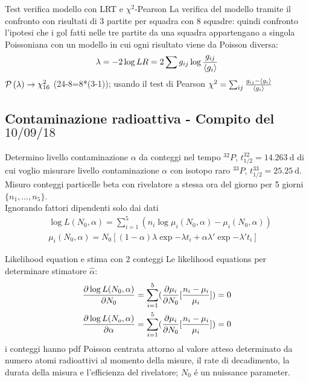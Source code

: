 \begin{frame}{Test verifica modello con LRT e $\chi^2$-Pearson}
La verifica del modello tramite il confronto con risultati di 3 partite per squadra con 8 squadre: quindi confronto l'ipotesi che i gol fatti nelle tre partite da una squadra appartengano a singola Poissoniana con un modello in cui ogni risultato viene da Poisson diversa:
\[\lambda=-2\log{LR}=2\sum g_{ij}\log{\frac{g_{ij}}{\exv{g_i}}}\]
$\prob{(\lambda)}\to\chi^2_{16}$ (24-8=8*(3-1)); usando il test di Pearson $\chi^2=\sum_{ij}\frac{g_{ij}-\exv{g_i}}{\exv{g_i}}$
\end{frame}

\subsection{Contaminazione radioattiva - Compito del $10/09/18$}

\begin{frame}{Determino livello contaminazione $\alpha$ da conteggi nel tempo}
$^{32}P$, $t_{1/2}^{32}=\SI{14.263}{\day}$ di cui voglio misurare livello contaminazione $\alpha$ con isotopo raro $^{33}P$, $t_{1/2}^{33}=\SI{25.25}{\day}$. Misuro conteggi particelle beta con rivelatore a stessa ora del giorno per 5 giorni $\{n_1,\ldots,n_5\}$.\\
Ignorando fattori dipendenti solo dai dati
\begin{align*}
&\log{L(N_0,\alpha)}=\sum_{i=1}^5(n_i\log{\mu_i(N_0,\alpha)}-\mu_i(N_0,\alpha))\\
&\mu_i(N_0,\alpha)=N_0[(1-\alpha)\lambda\exp{-\lambda t_i}+\alpha\lambda'\exp{-\lambda't_i}]
\end{align*}
\end{frame}

\begin{frame}{Likelihood equation e stima con 2 conteggi}
Le likelihood equations per determinare stimatore $\hat{\alpha}$:
\begin{align*}
&\PDy{N_0}{\log{L(N_0,\alpha)}}=\sum_{i=1}^5(\PDy{N_0}{\mu_i}[\frac{n_i-\mu_i}{\mu_i}])=0\\
&\PDy{\alpha}{\log{L(N_o,\alpha)}}=\sum_{i=1}^5(\PDy{N_0}{\mu_i}[\frac{n_i-\mu_i}{\mu_i}])=0
\end{align*}
i conteggi hanno pdf Poisson centrata attorno al valore atteso determinato da numero atomi radioattivi al momento della misure, il rate di decadimento, la durata della misura e l'efficienza del rivelatore; $N_0$ \'e un nuissance parameter.
\end{frame}

